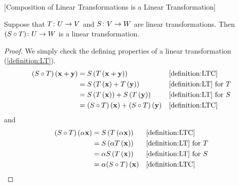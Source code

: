 \documentclass{ximera}
\begin{document}
\begin{theorem}
\label{theorem:CLTLT}
[Composition of Linear Transformations is a Linear Transformation]

Suppose that $T\colon U\rightarrow V$ and $S\colon V\rightarrow W$ are linear transformations.  Then $({S}\circ{T})\colon U\rightarrow W$ is a linear transformation.


\begin{proof}
We simply check the defining properties of a linear transformation (\ref{definition:LT}).
\begin{align*}
({S}\circ{T})\left(\mathbf{x}+\mathbf{y}\right)
&=S\left(T\left(\mathbf{x}+\mathbf{y}\right)\right)&&\ref{definition:LTC}\\
&=S\left(T\left(\mathbf{x}\right)+T\left(\mathbf{y}\right)\right)&&\ref{definition:LT}\text{ for }T\\
&=S\left(T\left(\mathbf{x}\right)\right)+S\left(T\left(\mathbf{y}\right)\right)&&\ref{definition:LT}\text{ for }S\\
&=({S}\circ{T})\left(\mathbf{x}\right)+({S}\circ{T})\left(\mathbf{y}\right)&&\ref{definition:LTC}
\end{align*}
and
\begin{align*}
({S}\circ{T})\left(\alpha\mathbf{x}\right)
&=S\left(T\left(\alpha\mathbf{x}\right)\right)&&\ref{definition:LTC}\\
&=S\left(\alpha T\left(\mathbf{x}\right)\right)&&\ref{definition:LT}\text{ for }T\\
&=\alpha S\left(T\left(\mathbf{x}\right)\right)&&\ref{definition:LT}\text{ for }S\\
&=\alpha({S}\circ{T})\left(\mathbf{x}\right)&&\ref{definition:LTC}
\end{align*}




\end{proof}
\end{theorem}
\end{document}
